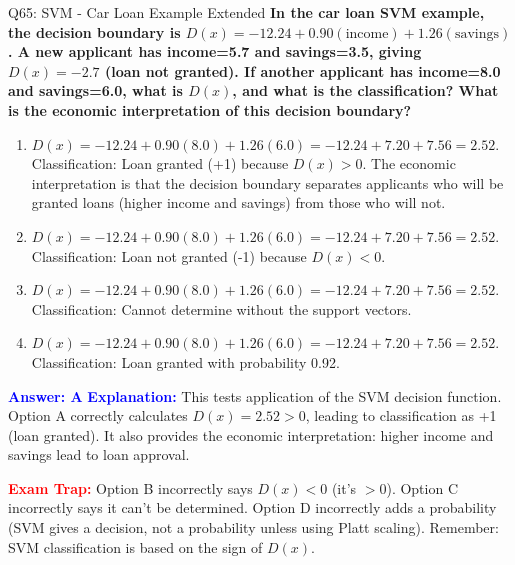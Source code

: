 \documentclass[8pt]{beamer}
\begin{document}
	\begin{frame}{Q65: SVM - Car Loan Example Extended}
		\fontsize{6.5}{7.5}\selectfont
		\textbf{In the car loan SVM example, the decision boundary is $D(x) = -12.24 + 0.90(\text{income}) + 1.26(\text{savings})$. A new applicant has income=5.7 and savings=3.5, giving $D(x) = -2.7$ (loan not granted). If another applicant has income=8.0 and savings=6.0, what is $D(x)$, and what is the classification? What is the economic interpretation of this decision boundary?}
		
		\begin{enumerate}
			\item $D(x) = -12.24 + 0.90(8.0) + 1.26(6.0) = -12.24 + 7.20 + 7.56 = 2.52$. Classification: Loan granted (+1) because $D(x) > 0$. The economic interpretation is that the decision boundary separates applicants who will be granted loans (higher income and savings) from those who will not.
			\item $D(x) = -12.24 + 0.90(8.0) + 1.26(6.0) = -12.24 + 7.20 + 7.56 = 2.52$. Classification: Loan not granted (-1) because $D(x) < 0$.
			\item $D(x) = -12.24 + 0.90(8.0) + 1.26(6.0) = -12.24 + 7.20 + 7.56 = 2.52$. Classification: Cannot determine without the support vectors.
			\item $D(x) = -12.24 + 0.90(8.0) + 1.26(6.0) = -12.24 + 7.20 + 7.56 = 2.52$. Classification: Loan granted with probability 0.92.
		\end{enumerate}
		
		\vspace{0.1cm}
		\textcolor{blue}{\textbf{Answer: A}}
		\vspace{0.1cm}
		\textcolor{blue}{\textbf{Explanation:}} This tests application of the SVM decision function. Option A correctly calculates $D(x) = 2.52 > 0$, leading to classification as +1 (loan granted). It also provides the economic interpretation: higher income and savings lead to loan approval.
		
		\textcolor{red}{\textbf{Exam Trap:}} Option B incorrectly says $D(x) < 0$ (it's $>0$). Option C incorrectly says it can't be determined. Option D incorrectly adds a probability (SVM gives a decision, not a probability unless using Platt scaling). Remember: SVM classification is based on the sign of $D(x)$.
	\end{frame}
	
\end{document}
